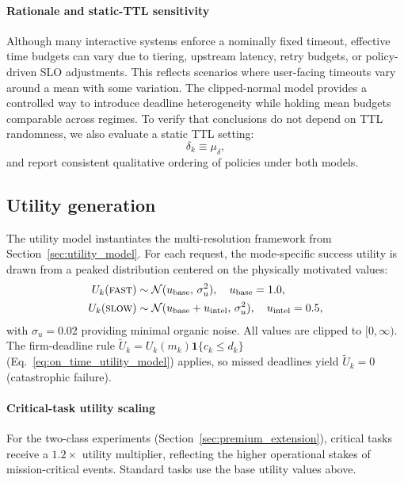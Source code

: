 \documentclass[preprint,12pt]{elsarticle}
\begin{document}
\paragraph{Rationale and static-TTL sensitivity}
Although many interactive systems enforce a nominally fixed timeout, effective time budgets can vary due to tiering, upstream latency, retry budgets, or policy-driven SLO adjustments. This reflects scenarios where user-facing timeouts vary around a mean with some variation. The clipped-normal model provides a controlled way to introduce deadline heterogeneity while holding mean budgets comparable across regimes. To verify that conclusions do not depend on TTL randomness, we also evaluate a static TTL setting:
\begin{equation}
\delta_k \equiv \mu_\delta,
\label{eq:ttl_static}
\end{equation}
and report consistent qualitative ordering of policies under both models.  

\subsection{Utility generation}
\label{sec:utility_generation}

The utility model instantiates the multi-resolution framework from Section~\ref{sec:utility_model}. For each request, the mode-specific success utility is drawn from a peaked distribution centered on the physically motivated values:
\begin{align*}
U_k(\textsc{fast}) &\sim \mathcal{N}(u_{\mathrm{base}},\, \sigma_u^2), \quad u_{\mathrm{base}} = 1.0,\\
U_k(\textsc{slow}) &\sim \mathcal{N}(u_{\mathrm{base}} + u_{\mathrm{intel}},\, \sigma_u^2), \quad u_{\mathrm{intel}} = 0.5,
\end{align*}
with $\sigma_u = 0.02$ providing minimal organic noise. All values are clipped to $[0, \infty)$. The firm-deadline rule $\tilde{U}_k = U_k(m_k)\mathbf{1}\{c_k \le d_k\}$ (Eq.~\eqref{eq:on_time_utility_model}) applies, so missed deadlines yield $\tilde{U}_k = 0$ (catastrophic failure).

\paragraph{Critical-task utility scaling}
For the two-class experiments (Section~\ref{sec:premium_extension}), critical tasks receive a $1.2\times$ utility multiplier, reflecting the higher operational stakes of mission-critical events. Standard tasks use the base utility values above.
\end{document}
